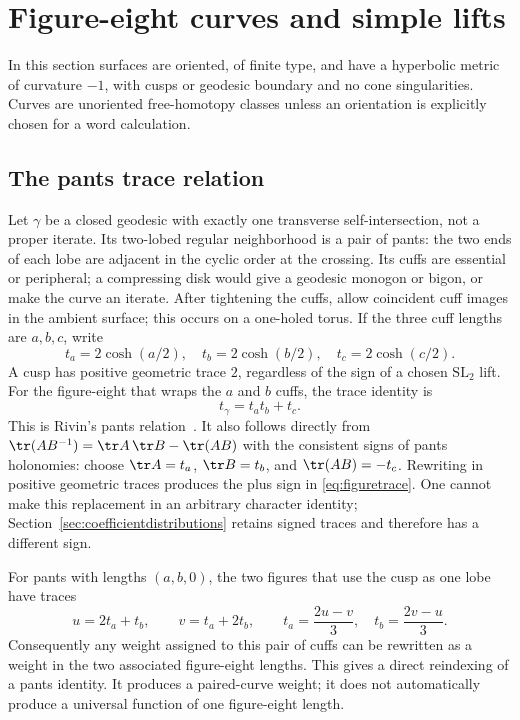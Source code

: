 \section{Figure-eight curves and simple lifts}
\label{sec:figures}

In this section surfaces are oriented, of finite type, and have a
hyperbolic metric of curvature $-1$, with cusps or geodesic boundary and
no cone singularities. Curves are unoriented free-homotopy classes unless
an orientation is explicitly chosen for a word calculation.

\subsection{The pants trace relation}

Let $\gamma$ be a closed geodesic with exactly one transverse self-intersection,
not a proper iterate. Its two-lobed regular neighborhood is a pair of
pants: the two ends of each lobe are adjacent in the cyclic order at the
crossing. Its cuffs are essential or peripheral; a compressing disk would
give a geodesic monogon or bigon, or make the curve an iterate.
After tightening the cuffs, allow coincident cuff images in the ambient
surface; this occurs on a one-holed torus. If the three cuff lengths are $a,b,c$,
write
\[
 t_a=2\cosh(a/2),\quad t_b=2\cosh(b/2),\quad t_c=2\cosh(c/2).
\]
A cusp has positive geometric trace $2$, regardless of the sign of a
chosen $\mathrm{SL}_2$ lift. For the figure-eight that wraps the $a$
and $b$ cuffs, the trace identity is
\begin{equation}
 \boxed{t_\gamma=t_at_b+t_c.}
 \label{eq:figuretrace}
\end{equation}
This is Rivin's pants relation~\cite[Theorem 1.3]{RivinFigures}. It also
follows directly from
$\tr(AB^{-1})=\tr A\,\tr B-\tr(AB)$ with the consistent signs of pants
holonomies: choose $\tr A=t_a$, $\tr B=t_b$, and $\tr(AB)=-t_c$.
Rewriting in positive geometric traces produces the plus sign in
\eqref{eq:figuretrace}. One cannot make this replacement in an arbitrary
character identity; Section~\ref{sec:coefficientdistributions} retains
signed traces and therefore has a different sign.

For pants with lengths $(a,b,0)$, the two figures that use the cusp as one
lobe have traces
\begin{equation}
 u=2t_a+t_b,\qquad v=t_a+2t_b,
 \qquad
 t_a=\frac{2u-v}{3},\quad t_b=\frac{2v-u}{3}.
 \label{eq:twofigures}
\end{equation}
Consequently any weight assigned to this pair of cuffs can be rewritten
as a weight in the two associated figure-eight lengths. This gives a
direct reindexing of a pants identity. It produces a paired-curve weight;
it does not automatically produce a universal function of one figure-eight
length.

